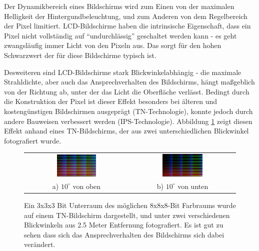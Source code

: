     Der Dynamikbereich eines Bildschirms wird zum Einen von der maximalen Helligkeit der Hintergundbeleuchtung, und zum Anderen von dem Regelbereich der Pixel limitiert. 
    LCD-Bildschirme haben die intrinsische Eigenschaft, dass ein Pixel nicht vollständig auf ``undurchlässig'' geschaltet werden kann - es geht zwangsläufig immer Licht von den Pixeln aus. 
    Das sorgt für den hohen Schwarzwert der für diese Bildschirme typisch ist.

    Desweiteren sind LCD-Bildschirme stark Blickwinkelabhängig - die maximale Strahldichte, aber auch das Ansprechverhalten des Bildschirms, hängt maßgeblich von der Richtung ab, unter der das Licht die Oberfläche verlässt.
    Bedingt durch die Konstruktion der Pixel ist dieser Effekt besonders bei älteren und kostengünstigen Bildschirmen ausgeprägt (TN-Technologie), konnte jedoch durch andere Bauweisen verbessert werden (IPS-Technologie).
    Abbildung \ref{fig:angular_effects} zeigt diesen Effekt anhand eines TN-Bildschirms, der aus zwei unterschiedlichen Blickwinkel fotografiert wurde.

  \begin{figure}[H]
    \centering
    \begin{tabular}{cc}
      \includegraphics[width=0.4\textwidth]{../graphics/grundlagen/lenovo_angle_v-10.png}
    & 
      \includegraphics[width=0.4\textwidth]{../graphics/grundlagen/lenovo_angle_v+10.png}
    \\  
    a) $10^\circ$ von oben & b) $10^\circ$ von unten \\
    \end{tabular}
    \caption[Blickwinkelabhängigkeit bei einem TN-Bildschirm]{Ein 3x3x3 Bit Unterraum des möglichen 8x8x8-Bit Farbraums wurde auf einem  TN-Bildschirm dargestellt, und unter zwei verschiedenen Blickwinkeln aus 2.5 Meter Entfernung fotografiert. 
   Es ist gut zu sehen dass sich das Ansprechverhalten des Bildschirms sich dabei verändert.   }
    \label{fig:angular_effects}
   \end{figure}

